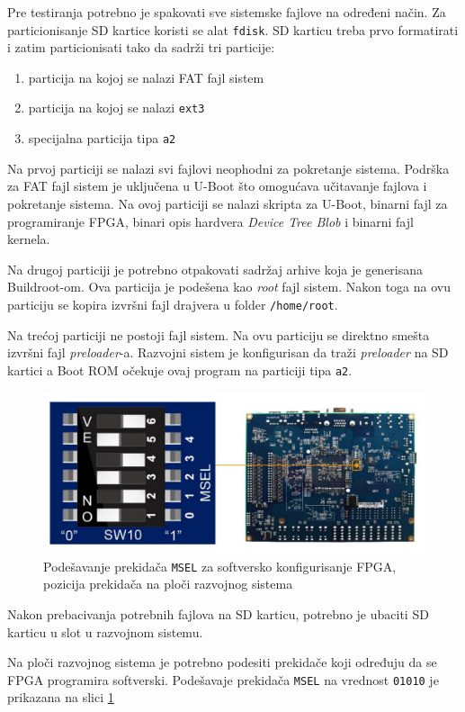 Pre testiranja potrebno je spakovati sve sistemske fajlove na određeni način. Za particionisanje SD kartice koristi se alat \texttt{fdisk}. SD karticu treba prvo formatirati i zatim particionisati tako da sadrži tri particije:
\begin{enumerate}
\item particija na kojoj se nalazi FAT fajl sistem
\item particija na kojoj se nalazi \texttt{ext3}
\item specijalna particija tipa \texttt{a2}
\end{enumerate}

Na prvoj particiji se nalazi svi fajlovi neophodni za pokretanje sistema. Podrška za FAT fajl sistem je uključena u U-Boot što omogućava učitavanje fajlova i pokretanje sistema. Na ovoj particiji se nalazi skripta za U-Boot, binarni fajl za programiranje FPGA, binari opis hardvera \textit{Device Tree Blob} i binarni fajl kernela.

Na drugoj particiji je potrebno otpakovati sadržaj arhive koja je generisana Buildroot-om.
Ova particija je podešena kao \textit{root} fajl sistem. Nakon toga na ovu particiju se kopira izvršni fajl drajvera u folder \texttt{/home/root}.

Na trećoj particiji ne postoji fajl sistem. Na ovu particiju se direktno smešta izvršni fajl \textit{preloader}-a. Razvojni sistem je konfigurisan da traži \textit{preloader} na SD kartici a Boot ROM očekuje ovaj program na particiji tipa \texttt{a2}.
\begin{figure}[h!]
\centering
\includegraphics[scale=0.35]{img/de1.png}
\caption{Podešavanje prekidača \texttt{MSEL} za softversko konfigurisanje FPGA, pozicija prekidača na ploči razvojnog sistema}
\label{slika1:de1}
\end{figure}
Nakon prebacivanja potrebnih fajlova na SD karticu, potrebno je ubaciti SD karticu u slot u razvojnom sistemu. 

Na ploči razvojnog sistema je potrebno podesiti prekidače koji određuju da se FPGA programira softverski. Podešavaje prekidača \texttt{MSEL} na vrednost \texttt{01010} je prikazana na slici \ref{slika1:de1}

